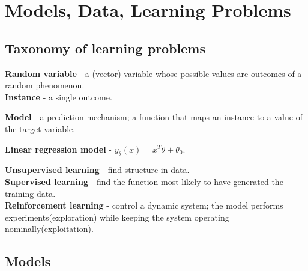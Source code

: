 \documentclass{article}
\newcommand{\para}[0]{\par\vspace{0.0cm}\noindent}
\newcommand{\define}[2]{\textbf{#1} - {#2}.  \\}
\begin{document}
\section{Models, Data, Learning Problems}
\subsection{Taxonomy of learning problems}
\define{Random variable}{a (vector) variable whose possible values are outcomes of a random phenomenon}
\define{Instance}{a single outcome}
\para
\define{Model}{a prediction mechanism; a function that maps an instance to a value of the target variable}
\para
\define{Linear regression model}{$y_\theta(x) = x^T \theta + \theta_0$}
\para
\define{Unsupervised learning}{find structure in data}
\define{Supervised learning}{find the function most likely to have generated the training data}
\define{Reinforcement learning}{control a dynamic system; the model performs experiments(exploration) while keeping the system operating nominally(exploitation)}


\subsection{Models}










    
\end{document}
